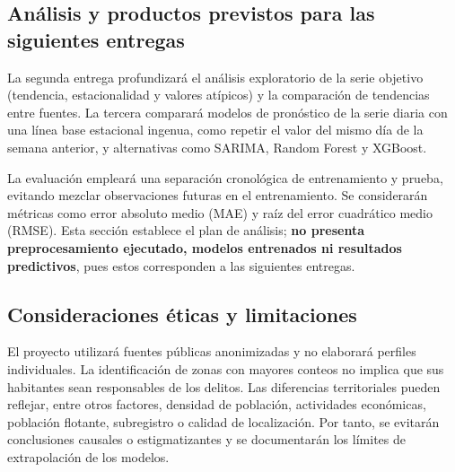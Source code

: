 \documentclass[12pt,letterpaper]{article}
\begin{document}
\subsection{Análisis y productos previstos para las siguientes entregas}

La segunda entrega profundizará el análisis exploratorio de la serie objetivo (tendencia, estacionalidad y valores atípicos) y la comparación de tendencias entre fuentes. La tercera comparará modelos de pronóstico de la serie diaria con una línea base estacional ingenua, como repetir el valor del mismo día de la semana anterior, y alternativas como SARIMA, Random Forest y XGBoost.

La evaluación empleará una separación cronológica de entrenamiento y prueba, evitando mezclar observaciones futuras en el entrenamiento. Se considerarán métricas como error absoluto medio (MAE) y raíz del error cuadrático medio (RMSE). Esta sección establece el plan de análisis; \textbf{no presenta preprocesamiento ejecutado, modelos entrenados ni resultados predictivos}, pues estos corresponden a las siguientes entregas.

\subsection{Consideraciones éticas y limitaciones}

El proyecto utilizará fuentes públicas anonimizadas y no elaborará perfiles individuales. La identificación de zonas con mayores conteos no implica que sus habitantes sean responsables de los delitos. Las diferencias territoriales pueden reflejar, entre otros factores, densidad de población, actividades económicas, población flotante, subregistro o calidad de localización. Por tanto, se evitarán conclusiones causales o estigmatizantes y se documentarán los límites de extrapolación de los modelos.
\end{document}
